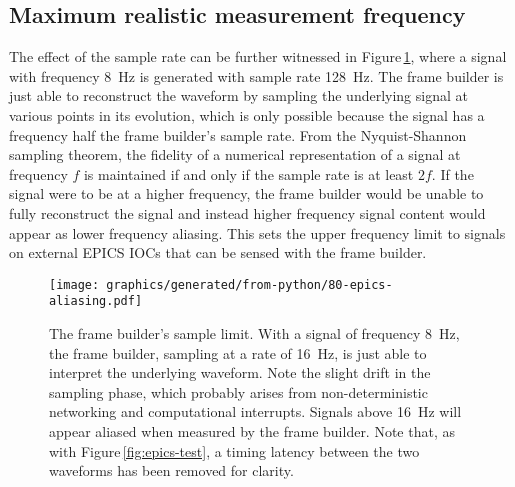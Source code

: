 \subsection{Maximum realistic measurement frequency}
The effect of the sample rate can be further witnessed in Figure\,\ref{fig:sample-aliasing}, where a signal with frequency \SI{8}{\hertz} is generated with sample rate \SI{128}{\hertz}. The frame builder is just able to reconstruct the waveform by sampling the underlying signal at various points in its evolution, which is only possible because the signal has a frequency half the frame builder's sample rate. From the Nyquist-Shannon sampling theorem, the fidelity of a numerical representation of a signal at frequency $f$ is maintained if and only if the sample rate is at least $2f$. If the signal were to be at a higher frequency, the frame builder would be unable to fully reconstruct the signal and instead higher frequency signal content would appear as lower frequency aliasing. This sets the upper frequency limit to signals on external \gls{EPICS} \gls{IOC}s that can be sensed with the frame builder.

\begin{figure}
  \centering
  \texttt{[image: graphics/generated/from-python/80-epics-aliasing.pdf]}
  \caption{\label{fig:sample-aliasing}The frame builder's sample limit. With a signal of frequency \SI{8}{\hertz}, the frame builder, sampling at a rate of \SI{16}{\hertz}, is just able to interpret the underlying waveform. Note the slight drift in the sampling phase, which probably arises from non-deterministic networking and computational interrupts. Signals above \SI{16}{\hertz} will appear aliased when measured by the frame builder. Note that, as with Figure\,\ref{fig:epics-test}, a timing latency between the two waveforms has been removed for clarity.}
\end{figure}